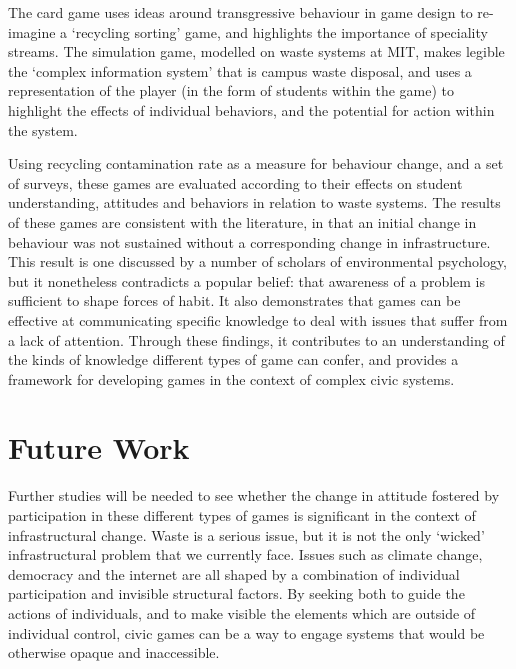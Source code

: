 \documentclass[nofonts,nols,justified,nobib]{tufte-book}
\begin{document}
The card game uses ideas around transgressive behaviour in game design to re-imagine a `recycling sorting' game, and highlights the importance of speciality streams. The  simulation game, modelled on waste systems at MIT, makes legible the `complex information system' that is campus waste disposal, and uses a representation of the player (in the form of students within the game) to highlight the effects of individual behaviors, and the potential for action within the system. 

Using recycling contamination rate as a measure for behaviour change, and a set of surveys, these games are evaluated according to their effects on student understanding, attitudes and behaviors in relation to waste systems. The results of these games are consistent with the literature, in that an initial change in behaviour was not sustained without a corresponding change in infrastructure. This result is one discussed by a number of scholars of environmental psychology, but it nonetheless contradicts a popular belief: that awareness of a problem is sufficient to shape forces of habit. It also demonstrates that games can be effective at communicating specific knowledge to deal with issues that suffer from a lack of attention. Through these findings, it contributes to an understanding of the kinds of knowledge different types of game can confer, and provides a framework for developing games in the context of complex civic systems.



\newpage

\section*{Future Work}
Further studies will be needed to see whether the change in attitude fostered by participation in these different types of games is significant in the context of infrastructural change. Waste is a serious issue, but it is not the only `wicked' infrastructural problem that we currently face. Issues such as climate change, democracy and the internet are all shaped by a combination of individual participation and invisible structural factors. By seeking both to guide the actions of individuals, and to make visible the elements which are outside of individual control, civic games can be a way to engage systems that would be otherwise opaque and inaccessible.
\end{document}
